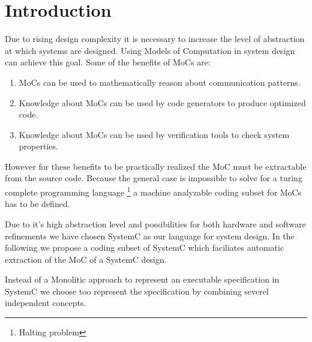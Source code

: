 \newcommand{\resdir}{../../../HscdTeXRes/}




\clearpage
\tableofcontents
\clearpage

\section{Introduction\label{intro}}
Due to rising design complexity it is necessary to increase
the level of abstraction at which systems are designed. Using
Models of Computation in system design can achieve this goal.
Some of the benefits of MoCs are:
\begin{enumerate}
\item MoCs can be used to mathematically reason about communication
patterns.

\item Knowledge about MoCs can be used by code generators to produce
optimized code.

\item Knowledge about MoCs can be used by verification tools to
check system properties.
\end{enumerate}
However for these benefits to be practically realized the
MoC must be extractable from the source code. Because the general case
is impossible to solve for a turing complete programming language
\footnote{Halting problem} a machine analyzable coding subset for
MoCs has to be defined.

Due to it's high abstraction level and possibilities for both
hardware and software refinements we have chosen SystemC as
our language for system design. In the following we propose a
coding subset of SystemC which faciliates automatic extraction
of the MoC of a SystemC design.

Instead of a Monolitic approach to represent an executable specification
in SystemC we choose too represent the specification
by combining severel independent concepts.

